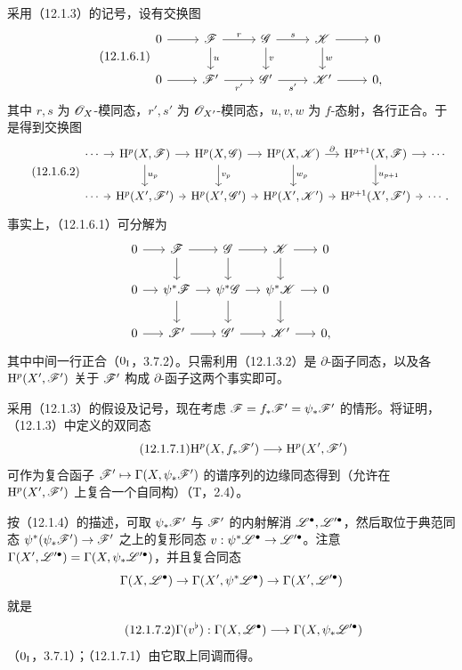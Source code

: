 采用（12.1.3）的记号，设有交换图
\begin{equation}\tag{12.1.6.1}
\begin{tikzcd}
0\arrow[r]&\F\arrow[r,"r"]\arrow[d,"u"]&\G\arrow[r,"s"]\arrow[d,"v"]&\K\arrow[r]\arrow[d,"w"]&0\\
0\arrow[r]&\F'\arrow[r,"r'"']&\G'\arrow[r,"s'"']&\K'\arrow[r]&0,
\end{tikzcd}
\end{equation}
其中 $r,s$ 为 $\mathscr O_X$-模同态，$r',s'$ 为 $\mathscr O_{X'}$-模同态，$u,v,w$ 为 $f$-态射，各行正合。于是得到交换图
\begin{equation}\tag{12.1.6.2}
\begin{tikzcd}[column sep=tiny]
\cdots\arrow[r]&\mathrm H^p(X,\F)\arrow[r]\arrow[d,"u_p"]&\mathrm H^p(X,\G)\arrow[r]\arrow[d,"v_p"]&\mathrm H^p(X,\K)\arrow[r,"\partial"]\arrow[d,"w_p"]&\mathrm H^{p+1}(X,\F)\arrow[r]\arrow[d,"u_{p+1}"]&\cdots\\
\cdots\arrow[r]&\mathrm H^p(X',\F')\arrow[r]&\mathrm H^p(X',\G')\arrow[r]&\mathrm H^p(X',\K')\arrow[r]&\mathrm H^{p+1}(X',\F')\arrow[r]&\cdots.
\end{tikzcd}
\end{equation}
事实上，（12.1.6.1）可分解为
\[
\begin{tikzcd}[column sep=small]
0\arrow[r]&\F\arrow[r]\arrow[d]&\G\arrow[r]\arrow[d]&\K\arrow[r]\arrow[d]&0\\
0\arrow[r]&\psi^*\F\arrow[r]\arrow[d]&\psi^*\G\arrow[r]\arrow[d]&\psi^*\K\arrow[r]\arrow[d]&0\\
0\arrow[r]&\F'\arrow[r]&\G'\arrow[r]&\K'\arrow[r]&0,
\end{tikzcd}
\]
其中中间一行正合（$0_{\mathrm I}$，3.7.2）。只需利用（12.1.3.2）是 $\partial$-函子同态，以及各 $\mathrm H^p(X',\mathscr F')$ 关于 $\mathscr F'$ 构成 $\partial$-函子这两个事实即可。

采用（12.1.3）的假设及记号，现在考虑 $\mathscr F=f_*\mathscr F'=\psi_*\mathscr F'$ 的情形。将证明，（12.1.3）中定义的双同态
\begin{equation}\tag{12.1.7.1}
\mathrm H^p(X,f_*\mathscr F')\longrightarrow\mathrm H^p(X',\mathscr F')
\end{equation}
可作为复合函子 $\mathscr F'\mapsto\Gamma(X,\psi_*\mathscr F')$ 的谱序列的边缘同态得到（允许在 $\mathrm H^p(X',\mathscr F')$ 上复合一个自同构）（T，2.4）。

按（12.1.4）的描述，可取 $\psi_*\mathscr F'$ 与 $\mathscr F'$ 的内射解消 $\mathscr L^\bullet,\mathscr L'^\bullet$，然后取位于典范同态 $\psi^*(\psi_*\mathscr F')\to\mathscr F'$ 之上的复形同态 $v:\psi^*\mathscr L^\bullet\to\mathscr L'^\bullet$。注意 $\Gamma(X',\mathscr L'^\bullet)=\Gamma(X,\psi_*\mathscr L'^\bullet)$，并且复合同态
\[
\Gamma(X,\mathscr L^\bullet)\to\Gamma(X',\psi^*\mathscr L^\bullet)\to\Gamma(X',\mathscr L'^\bullet)
\]
就是
\begin{equation}\tag{12.1.7.2}
\Gamma(v^\flat):\Gamma(X,\mathscr L^\bullet)\longrightarrow\Gamma(X,\psi_*\mathscr L'^\bullet)
\end{equation}
（$0_{\mathrm I}$，3.7.1）；（12.1.7.1）由它取上同调而得。

